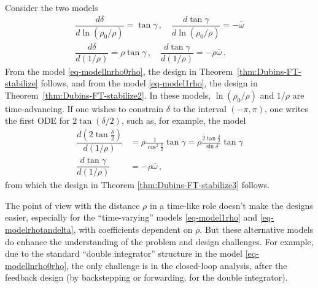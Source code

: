 \documentclass[letterpaper, 10 pt, conference]{ieeeconf}  %
\begin{document}
Consider the two models
\begin{eqnarray}
\label{eq-modellnrho0rho}
&\dfrac{d\delta}{d\ln(\rho_0/\rho)} = \tan\gamma\,, \quad \dfrac{d\tan\gamma}{d\ln(\rho_0/\rho)} = -\bar\omega&
\\
\label{eq-model1rho}
&\dfrac{d\delta}{d(1/\rho)} = \rho\tan\gamma\,, \quad \dfrac{d\tan\gamma}{d(1/\rho)} = -\rho\bar\omega\,.&
\end{eqnarray}
From the model \eqref{eq-modellnrho0rho}, 
the design in Theorem~\ref{thm:Dubins-FT-stabilize} follows, 
and from the model \eqref{eq-model1rho}, 
the design in Theorem~\ref{thm:Dubins-FT-stabilize2}. In these models, $\ln(\rho_0/\rho)$ and $1/\rho$ are time-advancing. If one wishes to constrain $\delta$ to the interval $(-\pi,\pi)$, one writes the first ODE for $2\tan(\delta/2)$, such as, for example, the model
\begin{subequations}
\label{eq-modelrhotandelta}
\begin{align}
\dfrac{d\left(2\tan\frac{\delta}{2}\right)}{d(1/\rho)} &= \rho\frac{1}{\cos^2\frac{\delta}{2}}\tan\gamma =\rho\frac{2\tan\frac{\delta}{2}}{\sin\delta}\tan\gamma\\
\dfrac{d\tan\gamma}{d(1/\rho)} &= -\rho\bar\omega\,,   
\end{align}
\end{subequations}
from which the design in Theorem \ref{thm:Dubins-FT-stabilize3} follows. 

The point of view with the distance $\rho$ in a time-like role doesn't make the designs easier, especially for the ``time-varying'' models \eqref{eq-model1rho} and \eqref{eq-modelrhotandelta}, with coefficients dependent on $\rho$. But these alternative models do enhance the understanding of the problem and design challenges. For example, due to the standard ``double integrator'' structure in the model \eqref{eq-modellnrho0rho}, the only challenge is in the closed-loop analysis, after the feedback design (by backstepping or forwarding, for the double integrator). 
\end{document}

